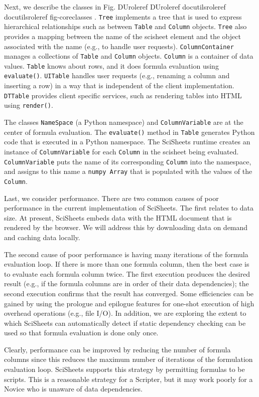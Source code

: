 \documentclass[letterpaper,compsoc,twoside]{IEEEtran}
\providecommand*{\DUrole}[2]{%
  \ifcsname DUrole#1\endcsname%
    \csname DUrole#1\endcsname{#2}%
  \else%
    \ifcsname docutilsrole#1\endcsname%
      \csname docutilsrole#1\endcsname{#2}%
    \else%
      #2%
    \fi%
  \fi%
}
\begin{document}
Next, we describe
the classes in
Fig. \DUrole{ref}{fig-coreclasses}.
\texttt{Tree} implements a tree that is used to express
hierarchical
relationships such as between \texttt{Table} and \texttt{Column} objects.
\texttt{Tree} also provides a mapping between the name of the
scisheet element
and the object associated with the name
(e.g., to handle user requests).
\texttt{ColumnContainer} manages a collections of \texttt{Table} and \texttt{Column} objects.
\texttt{Column} is a container of data values.
\texttt{Table} knows about rows, and it
does formula evaluation using \texttt{evaluate()}.
\texttt{UITable} handles user requests (e.g., renaming a column and
inserting a row) in a way that is independent of the client implementation.
\texttt{DTTable} provides client specific services, such as rendering tables into HTML using \texttt{render()}.

The classes \texttt{NameSpace} (a Python namespace) and \texttt{ColumnVariable}
are at the center of formula evaluation.
The \texttt{evaluate()} method in \texttt{Table} generates Python code that
is executed in a Python namespace.
The SciSheets runtime creates an instance of \texttt{ColumnVariable} for each
\texttt{Column} in the scisheet being evaluated.
\texttt{ColumnVariable} puts the name of its corresponding \texttt{Column} into the
namespace, and assigns
to this name a \texttt{numpy Array} that is populated with
the values of the \texttt{Column}.

Last, we consider performance.
There are two common
causes of poor performance
in the current implementation of SciSheets.
The first relates to data size.
At present,
SciSheets embeds data with the
HTML document that is rendered by the browser.
We will address this
by downloading data on demand and caching data locally.

The second cause of poor performance is having
many iterations of the formula evaluation loop.
If there is more than one formula column, then the best case is to
evaluate each formula column twice.
The first execution produces the desired result
(e.g.,
if the formula columns are in order of their data
dependencies);
the second execution confirms that the result has
converged.
Some efficiencies can be gained by using the prologue and
epilogue features for one-shot
execution of high overhead operations (e.g., file I/O).
In addition, we are exploring the extent to which SciSheets
can automatically detect if static dependency checking
can be used so that formula evaluation is done
only once.

Clearly, performance can be improved by reducing the number
of formula columns since this reduces the maximum number
of iterations of the formulation evaluation loop.
SciSheets supports this strategy by permitting
formulas to be scripts.
This is a reasonable strategy for a Scripter, but
it may work poorly for a Novice who is unaware
of data dependencies.
\end{document}
